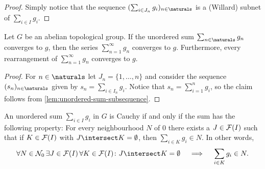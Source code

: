 \documentclass[article, a4paper, 11pt, oneside]{memoir}
\numberwithin{equation}{chapter}
\newcommand{\calL}{\mathcal{L}}
\begin{document}
\begin{proof}
    Simply notice that the sequence $(\sum_{i \in J_n} g_i)_{n\in\naturals}$ is a (Willard) subnet of $\sum_{i \in I} g_i$.
\end{proof}


\begin{proposition}
    Let $G$ be an abelian topological group. If the unordered sum $\sum_{n \in \naturals} g_n$ converges to $g$, then the series $\sum_{n=1}^\infty g_n$ converges to $g$. Furthermore, every rearrangement of $\sum_{n=1}^\infty g_n$ converges to $g$.
\end{proposition}

\begin{proof}
    For $n \in \naturals$ let $J_n = \{1, \ldots, n\}$ and consider the sequence $(s_n)_{n\in\naturals}$ given by $s_n = \sum_{i \in I_n} g_i$. Notice that $s_n = \sum_{i=1}^n g_i$, so the claim follows from \cref{lem:unordered-sum-subsequence}.
\end{proof}


\newcommand{\calN}{\mathcal{N}}
\newcommand{\nhoods}[1]{\calN_{#1}}
\newcommand{\pnhoods}[1]{\calN'_{#1}}
\newcommand{\limitval}{\calL}

\begin{lemma}
    An unordered sum $\sum_{i \in I} g_i$ in $G$ is Cauchy if and only if the sum has the following property: For every neighbourhood $N$ of $0$ there exists a $J \in \mathcal{F}(I)$ such that if $K \in \mathcal{F}(I)$ with $J \intersect K = \emptyset$, then $\sum_{i \in K} g_i \in N$. In other words,
    \begin{equation*}
        \forall N \in \nhoods{0} \,
            \exists J \in \finsubsets{I} \,
            \forall K \in \finsubsets{I}\colon
            J \intersect K = \emptyset
            \quad \implies \quad
            \sum_{i \in K} g_i \in N.
    \end{equation*}
\end{lemma}
\end{document}
